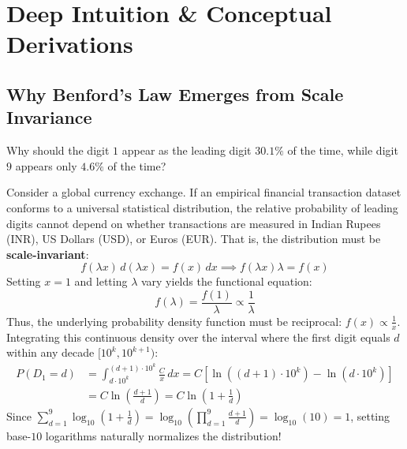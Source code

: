 \section{Deep Intuition \& Conceptual Derivations}

\subsection{Why Benford's Law Emerges from Scale Invariance}
Why should the digit $1$ appear as the leading digit $30.1\%$ of the time, while digit $9$ appears only $4.6\%$ of the time?

Consider a global currency exchange. If an empirical financial transaction dataset conforms to a universal statistical distribution, the relative probability of leading digits cannot depend on whether transactions are measured in Indian Rupees (INR), US Dollars (USD), or Euros (EUR). That is, the distribution must be \textbf{scale-invariant}:
\begin{equation}
f(\lambda x) \, d(\lambda x) = f(x) \, dx \implies f(\lambda x) \lambda = f(x)
\end{equation}
Setting $x = 1$ and letting $\lambda$ vary yields the functional equation:
\begin{equation}
f(\lambda) = \frac{f(1)}{\lambda} \propto \frac{1}{\lambda}
\end{equation}
Thus, the underlying probability density function must be reciprocal: $f(x) \propto \frac{1}{x}$. Integrating this continuous density over the interval where the first digit equals $d$ within any decade $[10^k, 10^{k+1})$:
\begin{align}
P(D_1 = d) &= \int_{d \cdot 10^k}^{(d+1) \cdot 10^k} \frac{C}{x} \, dx = C \left[ \ln((d+1) \cdot 10^k) - \ln(d \cdot 10^k) \right] \nonumber \\
&= C \ln\left(\frac{d+1}{d}\right) = C \ln\left(1 + \frac{1}{d}\right)
\end{align}
Since $\sum_{d=1}^9 \log_{10}\left(1 + \frac{1}{d}\right) = \log_{10}\left(\prod_{d=1}^9 \frac{d+1}{d}\right) = \log_{10}(10) = 1$, setting base-$10$ logarithms naturally normalizes the distribution!

